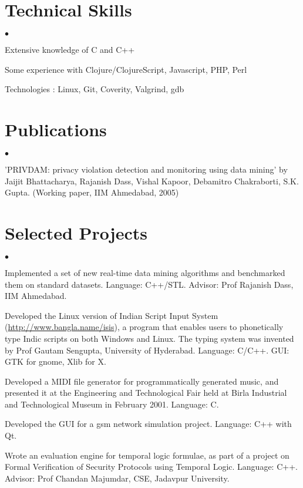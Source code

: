 \documentclass[margin,line]{res}
\newenvironment{list1}{
  \begin{list}{$\bullet$}{%
      \setlength{\itemsep}{0in}
      \setlength{\parsep}{0in} \setlength{\parskip}{0in}
      \setlength{\topsep}{0in} \setlength{\partopsep}{0in}
      \setlength{\leftmargin}{0.17in}}}{\end{list}}
\begin{document}
\begin{resume}
\section{\sc Technical Skills}
\begin{list1}
	\item Extensive knowledge of C and C++
	\item Some experience with Clojure/ClojureScript, Javascript, PHP, Perl
	\item Technologies : Linux, Git, Coverity, Valgrind, gdb
\end{list1}

\section{\sc Publications}
\begin{list1}
	\item 'PRIVDAM: privacy violation detection and monitoring using data mining'
by Jaijit Bhattacharya, Rajanish Dass, Vishal Kapoor, Debamitro Chakraborti, S.K. Gupta.
(Working paper, IIM Ahmedabad, 2005)
\end{list1}

\section{\sc Selected Projects}
\begin{list1}
	\item Implemented a set of new real-time data mining algorithms and benchmarked them on standard datasets. Language: C++/STL. Advisor: Prof Rajanish Dass, IIM Ahmedabad.
	\item Developed the Linux version of Indian Script Input System (\url{http://www.bangla.name/isis}), a program that enables users to phonetically type Indic scripts on both Windows and Linux. The typing system was invented by Prof Gautam Sengupta, University of Hyderabad. Language: C/C++. GUI: GTK for gnome, Xlib for X.
	\item Developed a MIDI file generator for programmatically generated music, and presented it at the Engineering and Technological Fair held at Birla Industrial and Technological Museum in February 2001. Language: C.
	\item Developed the GUI for a gsm network simulation project. Language: C++ with Qt.
	\item Wrote an evaluation engine for temporal logic formulae, as part of a project on Formal Verification of Security Protocols using Temporal Logic. Language: C++. Advisor: Prof Chandan Majumdar, CSE, Jadavpur University.
\end{list1}


\end{resume}
\end{document}
